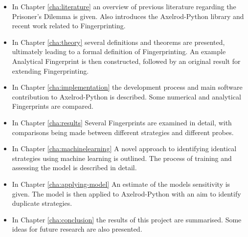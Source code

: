 \begin{itemize}
    \item In Chapter \ref{cha:literature} an overview of previous literature regarding the Prisoner's Dilemma is given.
    Also introduces the Axelrod-Python library and recent work related to Fingerprinting.

    \item In Chapter \ref{cha:theory} several definitions and theorems are presented, ultimately leading to a formal definition of Fingerprinting.
    An example Analytical Fingerprint is then constructed, followed by an original result for extending Fingerprinting.
    \item In Chapter \ref{cha:implementation} the development process and main software contribution to Axelrod-Python is described.
    Some numerical and analytical Fingerprints are compared.
    \item In Chapter \ref{cha:results} Several Fingerprints are examined in detail, with comparisons being made between different strategies and different probes.
    \item In Chapter \ref{cha:machinelearning} A novel approach to identifying identical strategies using machine learning is outlined. The process of training and assessing the model is described in detail.
    \item In Chapter \ref{cha:applying-model} An estimate of the models sensitivity is given.
    The model is then applied to Axelrod-Python with an aim to identify duplicate strategies.
    \item In Chapter \ref{cha:conclusion} the results of this project are summarised. Some ideas for future research are also presented.
\end{itemize}

